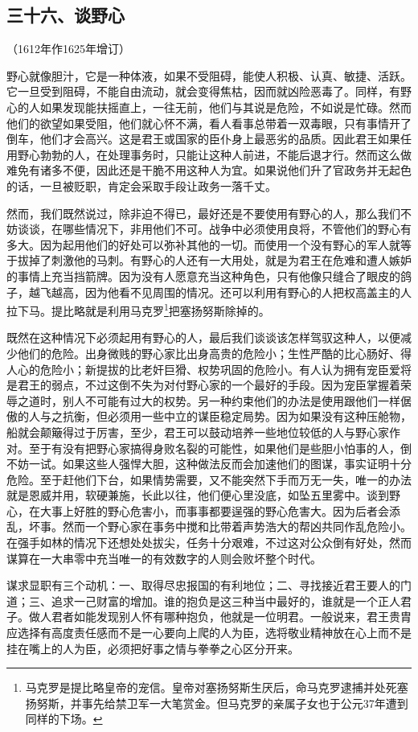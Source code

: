 \subsection*{三十六、谈野心}
\begin{center}
    （1612年作1625年增订）
\end{center}

\par 野心就像胆汁，它是一种体液，如果不受阻碍，能使人积极、认真、敏捷、活跃。它一旦受到阻碍，不能自由流动，就会变得焦枯，因而就凶险恶毒了。同样，有野心的人如果发现能扶摇直上，一往无前，他们与其说是危险，不如说是忙碌。然而他们的欲望如果受阻，他们就心怀不满，看人看事总带着一双毒眼，只有事情开了倒车，他们才会高兴。这是君王或国家的臣仆身上最恶劣的品质。因此君王如果任用野心勃勃的人，在处理事务时，只能让这种人前进，不能后退才行。然而这么做难免有诸多不便，因此还是干脆不用这种人为宜。如果说他们升了官政务并无起色的话，一旦被贬职，肯定会采取手段让政务一落千丈。
\par 然而，我们既然说过，除非迫不得已，最好还是不要使用有野心的人，那么我们不妨谈谈，在哪些情况下，非用他们不可。战争中必须使用良将，不管他们的野心有多大。因为起用他们的好处可以弥补其他的一切。而使用一个没有野心的军人就等于拔掉了刺激他的马刺。有野心的人还有一大用处，就是为君王在危难和遭人嫉妒的事情上充当挡箭牌。因为没有人愿意充当这种角色，只有他像只缝合了眼皮的鸽子，越飞越高，因为他看不见周围的情况。还可以利用有野心的人把权高盖主的人拉下马。提比略就是利用马克罗\footnote{马克罗是提比略皇帝的宠信。皇帝对塞扬努斯生厌后，命马克罗逮捕并处死塞扬努斯，并事先给禁卫军一大笔赏金。但马克罗的亲属子女也于公元37年遭到同样的下场。}把塞扬努斯除掉的。
\par 既然在这种情况下必须起用有野心的人，最后我们谈谈该怎样驾驭这种人，以便减少他们的危险。出身微贱的野心家比出身高贵的危险小；生性严酷的比心肠好、得人心的危险小；新提拔的比老奸巨猾、权势巩固的危险小。有人认为拥有宠臣爱将是君王的弱点，不过这倒不失为对付野心家的一个最好的手段。因为宠臣掌握着荣辱之道时，别人不可能有过大的权势。另一种约束他们的办法是使用跟他们一样倨傲的人与之抗衡，但必须用一些中立的谋臣稳定局势。因为如果没有这种压舱物，船就会颠簸得过于厉害，至少，君王可以鼓动培养一些地位较低的人与野心家作对。至于有没有把野心家搞得身败名裂的可能性，如果他们是些胆小怕事的人，倒不妨一试。如果这些人强悍大胆，这种做法反而会加速他们的图谋，事实证明十分危险。至于赶他们下台，如果情势需要，又不能突然下手而万无一失，唯一的办法就是恩威并用，软硬兼施，长此以往，他们便心里没底，如坠五里雾中。谈到野心，在大事上好胜的野心危害小，而事事都要逞强的野心危害大。因为后者会添乱，坏事。然而一个野心家在事务中搅和比带着声势浩大的帮凶共同作乱危险小。在强手如林的情况下还想处处拔尖，任务十分艰难，不过这对公众倒有好处，然而谋算在一大串零中充当唯一的有效数字的人则会败坏整个时代。
\par 谋求显职有三个动机：一、取得尽忠报国的有利地位；二、寻找接近君王要人的门道；三、追求一己财富的增加。谁的抱负是这三种当中最好的，谁就是一个正人君子。做人君者如能发现别人怀有哪种抱负，他就是一位明君。一般说来，君王贵胄应选择有高度责任感而不是一心要向上爬的人为臣，选将敬业精神放在心上而不是挂在嘴上的人为臣，必须把好事之情与拳拳之心区分开来。



